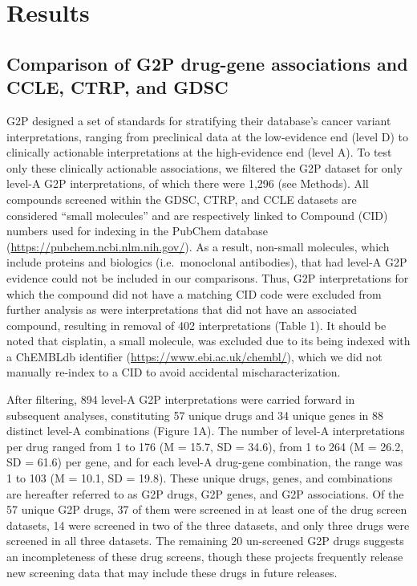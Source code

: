 \documentclass[man]{apa6}
\begin{document}
\section{Results}\label{results}

\subsection{Comparison of G2P drug-gene associations and CCLE, CTRP, and
GDSC}\label{comparison-of-g2p-drug-gene-associations-and-ccle-ctrp-and-gdsc}

G2P designed a set of standards for stratifying their database's cancer
variant interpretations, ranging from preclinical data at the
low-evidence end (level D) to clinically actionable interpretations at
the high-evidence end (level A). To test only these clinically
actionable associations, we filtered the G2P dataset for only level-A
G2P interpretations, of which there were 1,296 (see Methods). All
compounds screened within the GDSC, CTRP, and CCLE datasets are
considered \enquote{small molecules} and are respectively linked to
Compound (CID) numbers used for indexing in the PubChem database
(\url{https://pubchem.ncbi.nlm.nih.gov/}). As a result, non-small
molecules, which include proteins and biologics (i.e.~monoclonal
antibodies), that had level-A G2P evidence could not be included in our
comparisons. Thus, G2P interpretations for which the compound did not
have a matching CID code were excluded from further analysis as were
interpretations that did not have an associated compound, resulting in
removal of 402 interpretations (Table 1). It should be noted that
cisplatin, a small molecule, was excluded due to its being indexed with
a ChEMBLdb identifier (\url{https://www.ebi.ac.uk/chembl/}), which we
did not manually re-index to a CID to avoid accidental
mischaracterization.

After filtering, 894 level-A G2P interpretations were carried forward in
subsequent analyses, constituting 57 unique drugs and 34 unique genes in
88 distinct level-A combinations (Figure 1A). The number of level-A
interpretations per drug ranged from 1 to 176 (M = 15.7, SD = 34.6),
from 1 to 264 (M = 26.2, SD = 61.6) per gene, and for each level-A
drug-gene combination, the range was 1 to 103 (M = 10.1, SD = 19.8).
These unique drugs, genes, and combinations are hereafter referred to as
G2P drugs, G2P genes, and G2P associations. Of the 57 unique G2P drugs,
37 of them were screened in at least one of the drug screen datasets, 14
were screened in two of the three datasets, and only three drugs were
screened in all three datasets. The remaining 20 un-screened G2P drugs
suggests an incompleteness of these drug screens, though these projects
frequently release new screening data that may include these drugs in
future releases.
\end{document}
